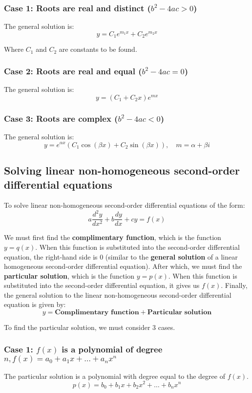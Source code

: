 \documentclass[11pt]{article}
\begin{document}
\subsubsection{Case 1: Roots are real and distinct (\(b^2 - 4ac > 0\))}
\label{sec:org51d7f70}
The general solution is:
\[y = C_1 e^{m_1 x} + C_2 e^{m_2 x}\]

Where \(C_1\) and \(C_2\) are constants to be found.

\subsubsection{Case 2: Roots are real and equal (\(b^2 - 4ac = 0\))}
\label{sec:org133215c}
The general solution is:
\[y = (C_1 + C_2 x) e^{mx}\]

\subsubsection{Case 3: Roots are complex (\(b^2 - 4ac < 0\))}
\label{sec:org9dbd9f6}
The general solution is:
\[y = e^{\alpha x} (C_1 \cos (\beta x) + C_2 \sin (\beta x)), \quad m = \alpha + \beta i\]

\subsection{Solving linear non-homogeneous second-order differential equations}
\label{sec:org0ce37a9}
To solve linear non-homogeneous second-order differential equations of the form:
\[a \frac{d^2y}{dx^2} + b \frac{dy}{dx} + cy = f(x)\]

We must first find the \textbf{complimentary function}, which is the function \(y = q(x)\). When this function is substituted into the second-order differential equation, the right-hand side is 0 (similar to the \textbf{general solution} of a linear homogeneous second-order differential equation). After which, we must find the \textbf{particular solution}, which is the function \(y = p(x)\). When this function is substituted into the second-order differential equation, it gives us \(f(x)\). Finally, the general solution to the linear non-homogeneous second-order differential equation is given by:
\[y = \textbf{Complimentary function} + \textbf{Particular solution}\]

To find the particular solution, we must consider 3 cases.

\subsubsection{Case 1: \(f(x)\) is a polynomial of degree \(n, f(x) = a_0 + a_1 x + \ldots + a_n x^n\)}
\label{sec:org0e0fe85}
The particular solution is a polynomial with degree equal to the degree of \(f(x)\).
\[p(x) = b_0 + b_1 x + b_2 x^2 + \ldots + b_n x^n\]
\end{document}
